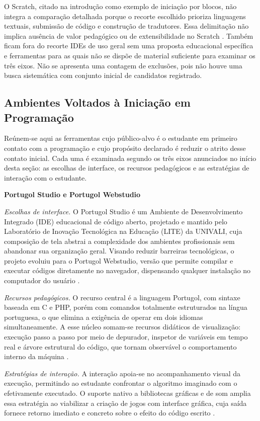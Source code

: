 O Scratch, citado na introdução como exemplo de iniciação por blocos, não integra a comparação detalhada porque o recorte escolhido prioriza linguagens textuais, submissão de código e construção de tradutores. Essa delimitação não implica ausência de valor pedagógico ou de extensibilidade no Scratch \cite{scratch2026}. Também ficam fora do recorte IDEs de uso geral sem uma proposta educacional específica e ferramentas para as quais não se dispõe de material suficiente para examinar os três eixos. Não se apresenta uma contagem de exclusões, pois não houve uma busca sistemática com conjunto inicial de candidatos registrado.

\subsection{Ambientes Voltados à Iniciação em Programação}

Reúnem-se aqui as ferramentas cujo público-alvo é o estudante em primeiro contato com a programação e cujo propósito declarado é reduzir o atrito desse contato inicial. Cada uma é examinada segundo os três eixos anunciados no início desta seção: as escolhas de interface, os recursos pedagógicos e as estratégias de interação com o estudante.

\noindent\textbf{Portugol Studio e Portugol Webstudio}

\textit{Escolhas de interface.} O Portugol Studio é um Ambiente de Desenvolvimento Integrado (IDE) educacional de código aberto, projetado e mantido pelo Laboratório de Inovação Tecnológica na Educação (LITE) da UNIVALI, cuja composição de tela abstrai a complexidade dos ambientes profissionais sem abandonar sua organização geral. Visando reduzir barreiras tecnológicas, o projeto evoluiu para o Portugol Webstudio, versão que permite compilar e executar códigos diretamente no navegador, dispensando qualquer instalação no computador do usuário \cite{univali2026,martins2025}.

\textit{Recursos pedagógicos.} O recurso central é a linguagem Portugol, com sintaxe baseada em C e PHP, porém com comandos totalmente estruturados na língua portuguesa, o que elimina a exigência de operar em dois idiomas simultaneamente. A esse núcleo somam-se recursos didáticos de visualização: execução passo a passo por meio de depurador, inspetor de variáveis em tempo real e árvore estrutural do código, que tornam observável o comportamento interno da máquina \cite{univali2026,gomes2020}.

\textit{Estratégias de interação.} A interação apoia-se no acompanhamento visual da execução, permitindo ao estudante confrontar o algoritmo imaginado com o efetivamente executado. O suporte nativo a bibliotecas gráficas e de som amplia essa estratégia ao viabilizar a criação de jogos com interface gráfica, cuja saída fornece retorno imediato e concreto sobre o efeito do código escrito \cite{gomes2020,martins2025}.

